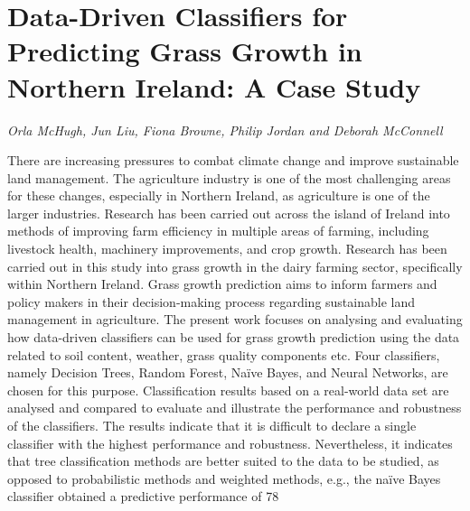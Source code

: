 \documentclass[../booklet.tex]{subfiles}
\begin{document}
\section[Data-Driven Classifiers for Predicting Grass Growth in Northern Ireland: A Case Study. {\it Orla McHugh, Jun Liu, Fiona Browne, Philip Jordan and Deborah McConnell}]{Data-Driven Classifiers for Predicting Grass Growth in Northern Ireland: A Case Study}
    

\begin{center}
  {\it Orla McHugh, Jun Liu, Fiona Browne, Philip Jordan and Deborah McConnell}
\end{center}

\vskip 0.8cm

There are increasing pressures to combat climate change and improve sustainable land management. The agriculture industry is one of the most challenging areas for these changes, especially in Northern Ireland, as agriculture is one of the larger industries. Research has been carried out across the island of Ireland into methods of improving farm efficiency in multiple areas of farming, including livestock health, machinery improvements, and crop growth. Research has been carried out in this study into grass growth in the dairy farming sector, specifically within Northern Ireland. Grass growth prediction aims to inform farmers and policy makers in their decision-making process regarding sustainable land management in agriculture. The present work focuses on analysing and evaluating how data-driven classifiers can be used for grass growth prediction using the data related to soil content, weather, grass quality components etc. Four classifiers, namely Decision Trees, Random Forest, Naïve Bayes, and Neural Networks, are chosen for this purpose. Classification results based on a real-world data set are analysed and compared to evaluate and illustrate the performance and robustness of the classifiers. The results indicate that it is difficult to declare a single classifier with the highest performance and robustness. Nevertheless, it indicates that tree classification methods are better suited to the data to be studied, as opposed to probabilistic methods and weighted methods, e.g., the naïve Bayes classifier obtained a predictive performance of 78%
\end{document}
